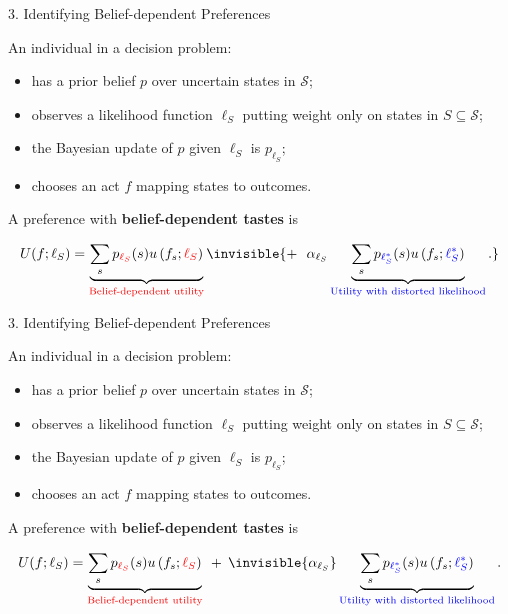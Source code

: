 \documentclass[usenames,dvipsnames,aspectratio=169,11pt,handout]{beamer}
\begin{document}
\begin{frame}{3. Identifying Belief-dependent Preferences}

	An individual in a decision problem:

	\vfill

	\begin{itemize}
		\item has a prior belief \( p \) over uncertain states in \( \mathcal{S} \); \pause
		\item observes a likelihood function \( \ell_S \) putting weight only on states in \( S \subseteq \mathcal{S} \); \pause
		\item the Bayesian update of \( p \) given \( \ell_S \) is \( p_{\ell_S} \); \pause
		\item chooses an act \( f \) mapping states to outcomes. \pause
	\end{itemize}

	\vfill

	A preference with \textbf{belief-dependent tastes} is
	\vfill

	\[
		U (f ; \ell_S)= \underbrace{\sum_s p_{\textcolor{red}{\ell_S}} (s) u\left(f_s ; \textcolor{red}{\ell_S} \right)}_{\text{\textcolor{red}{Belief-dependent utility}}} \invisible{+ \: \: \: \alpha_{\ell_S} \underbrace{\sum_s p_{\textcolor{blue}{\ell^{*}_{S}}} (s) u\left(f_s ; \textcolor{blue}{\ell^{*}_{S}} \right)}_{\text{\textcolor{blue}{Utility with distorted likelihood}}}.}
	\]


\end{frame}

\begin{frame}[noframenumbering]{3. Identifying Belief-dependent Preferences}

	An individual in a decision problem:

	\vfill

	\begin{itemize}
		\item has a prior belief \( p \) over uncertain states in \( \mathcal{S} \); \pause
		\item observes a likelihood function \( \ell_S \) putting weight only on states in \( S \subseteq \mathcal{S} \); \pause
		\item the Bayesian update of \( p \) given \( \ell_S \) is \( p_{\ell_S} \); \pause
		\item chooses an act \( f \) mapping states to outcomes. \pause
	\end{itemize}

	\vfill

	A preference with \textbf{belief-dependent tastes} is
	\vfill

	\[
		U (f ; \ell_S)= \underbrace{\sum_s p_{\textcolor{red}{\ell_S}} (s) u\left(f_s ; \textcolor{red}{\ell_S} \right)}_{\text{\textcolor{red}{Belief-dependent utility}}} \: \: + \: \: \invisible{\alpha_{\ell_S}} \underbrace{\sum_s p_{\textcolor{blue}{\ell^{*}_{S}}} (s) u\left(f_s ; \textcolor{blue}{\ell^{*}_{S}} \right)}_{\text{\textcolor{blue}{Utility with distorted likelihood}}}.
	\]


\end{frame}
\end{document}
